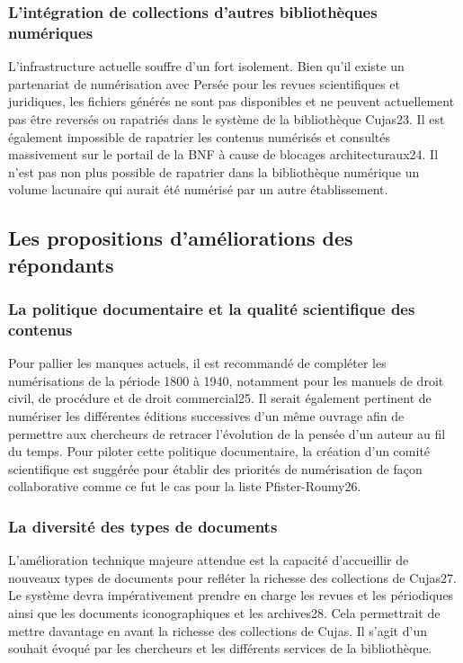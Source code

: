 \subsubsection{L’intégration de collections d’autres bibliothèques numériques} 

L’infrastructure actuelle souffre d’un fort isolement. Bien qu’il existe un partenariat de numérisation avec Persée pour les revues scientifiques et juridiques, les fichiers générés ne sont pas disponibles et ne peuvent actuellement pas être reversés ou rapatriés dans le système de la bibliothèque Cujas23. Il est également impossible de rapatrier les contenus numérisés et consultés massivement sur le portail de la BNF à cause de blocages architecturaux24. Il n’est pas non plus possible de rapatrier dans la bibliothèque numérique un volume lacunaire qui aurait été numérisé par un autre établissement. 

\subsection{Les propositions d’améliorations des répondants}

\subsubsection{La politique documentaire et la qualité scientifique des contenus}

Pour pallier les manques actuels, il est recommandé de compléter les numérisations de la période 1800 à 1940, notamment pour les manuels de droit civil, de procédure et de droit commercial25. Il serait également pertinent de numériser les différentes éditions successives d’un même ouvrage afin de permettre aux chercheurs de retracer l’évolution de la pensée d’un auteur au fil du temps. Pour piloter cette politique documentaire, la création d’un comité scientifique est suggérée pour établir des priorités de numérisation de façon collaborative comme ce fut le cas pour la liste Pfister-Roumy26.  

\subsubsection{La diversité des types de documents}

L’amélioration technique majeure attendue est la capacité d’accueillir de nouveaux types de documents pour refléter la richesse des collections de Cujas27. Le système devra impérativement prendre en charge les revues et les périodiques ainsi que les documents iconographiques et les archives28. Cela permettrait de mettre davantage en avant la richesse des collections de Cujas. Il s’agit d’un souhait évoqué par les chercheurs et les différents services de la bibliothèque.  

